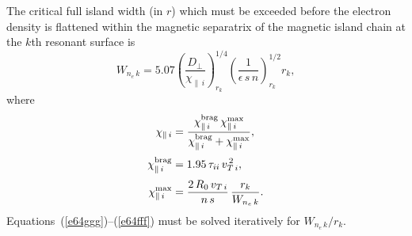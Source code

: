 \documentclass[12pt,prb,aps]{revtex4-1}
\begin{document}
The critical full island width (in $r$) which must be exceeded before the electron density is flattened within the
magnetic separatrix of the magnetic island chain at the $k$th resonant surface is\,\cite{fitz,brag}
\begin{equation}\label{e64ggg}
W_{n_e\,k}= 5.07\left(\frac{D_\perp}{\chi_{\parallel\,i}}\right)^{1/4}_{r_k}\left(\frac{1}{\epsilon\,s\,n}\right)^{1/2}_{r_k}r_k,
\end{equation}
where 
\begin{align}
\chi_{\parallel\,i}&= \frac{\chi_{\parallel\,i}^{\rm brag}\,\chi_{\parallel\,i}^{\rm max}}{\chi_{\parallel\,i}^{\rm brag}+\chi_{\parallel\,i}^{\rm max}},\\[0.5ex]
\chi_{\parallel\,i}^{\rm brag} &= 1.95\,\tau_{ii}\,v_{T\,i}^{\,2},\\[0.5ex]
\chi_{\parallel\,i}^{\rm max} &= \frac{2\,R_0\,v_{T\,i}}{n\,s}\,\frac{r_k}{W_{n_e\,k}}.\label{e64fff}
\end{align}
Equations~(\ref{e64ggg})--(\ref{e64fff}) must be solved iteratively for $W_{n_e\,k}/r_k$.
\end{document}
